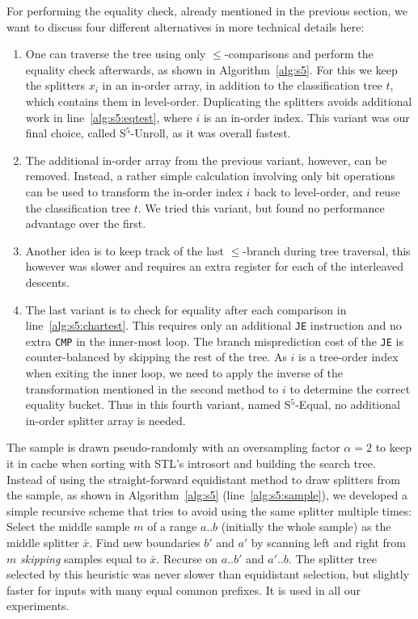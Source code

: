 \documentclass[a4paper]{myjournal}
\begin{document}
For performing the equality check, already mentioned in the previous section, we
want to discuss four different alternatives in more technical details here:
\begin{enumerate}
\item One can traverse the tree using only $\leq$-comparisons and perform the
  equality check afterwards, as shown in Algorithm~\ref{alg:s5}. For this we
  keep the splitters $x_i$ in an in-order array, in addition to the
  classification tree $t$, which contains them in level-order. Duplicating the
  splitters avoids additional work in line~\ref{alg:s5:eqtest}, where $i$ is an
  in-order index. This variant was our final choice, called S$^5$-Unroll, as it
  was overall fastest.

\item The additional in-order array from the previous variant, however, can be
  removed. Instead, a rather simple calculation involving only bit operations
  can be used to transform the in-order index $i$ back to level-order, and reuse
  the classification tree $t$. We tried this variant, but found no performance
  advantage over the first.

\item Another idea is to keep track of the last $\leq$-branch during tree
  traversal, this however was slower and requires an extra register for each of
  the interleaved descents.

\item The last variant is to check for equality after each comparison in
  line~\ref{alg:s5:chartest}. This requires only an additional \texttt{JE}
  instruction and no extra \texttt{CMP} in the inner-most loop.  The branch
  misprediction cost of the \texttt{JE} is counter-balanced by skipping the rest
  of the tree.  As $i$ is a tree-order index when exiting the inner loop, we
  need to apply the inverse of the transformation mentioned in the second method
  to $i$ to determine the correct equality bucket.  Thus in this fourth variant,
  named S$^5$-Equal, no additional in-order splitter array is needed.

\end{enumerate}

The sample is drawn pseudo-randomly with an oversampling factor $\alpha = 2$ to
keep it in cache when sorting with STL's introsort and building the search tree.
Instead of using the straight-forward equidistant method to draw splitters from
the sample, as shown in Algorithm~\ref{alg:s5} (line~\ref{alg:s5:sample}), we
developed a simple recursive scheme that tries to avoid using the same splitter
multiple times: Select the middle sample $m$ of a range $a..b$ (initially the
whole sample) as the middle splitter $\bar{x}$. Find new boundaries $b'$ and
$a'$ by scanning left and right from $m$ \emph{skipping} samples equal to
$\bar{x}$. Recurse on $a..b'$ and $a'..b$.  The splitter tree selected by this
heuristic was never slower than equidistant selection, but slightly faster for
inputs with many equal common prefixes. It is used in all our experiments.
\end{document}
